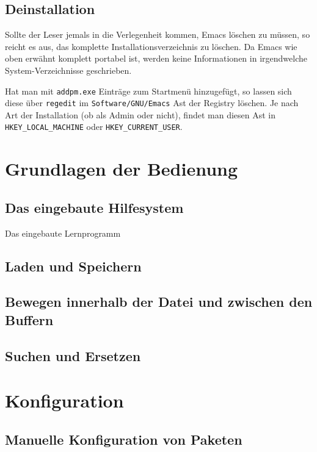 \documentclass[12pt,ngerman]{scrbook}
\begin{document}
\section{Deinstallation}

Sollte der Leser jemals in die Verlegenheit kommen, Emacs löschen zu müssen, so reicht es aus, das komplette Installationsverzeichnis zu löschen. Da Emacs wie oben erwähnt komplett portabel ist, werden keine Informationen in irgendwelche System-Verzeichnisse geschrieben.

Hat man mit \texttt{addpm.exe} Einträge zum Startmenü hinzugefügt, so lassen sich diese über \texttt{regedit} im \texttt{Software/GNU/Emacs} Ast der Registry löschen. Je nach Art der Installation (ob als Admin oder nicht), findet man diesen Ast in \verb|HKEY_LOCAL_MACHINE| oder \verb|HKEY_CURRENT_USER|.


\chapter{Grundlagen der Bedienung}

\section{Das eingebaute Hilfesystem}

Das eingebaute Lernprogramm

\section{Laden und Speichern}

\section{Bewegen innerhalb der Datei und zwischen den Buffern}

\section{Suchen und Ersetzen}

\chapter{Konfiguration}

\section{Manuelle Konfiguration von Paketen}
\end{document}
